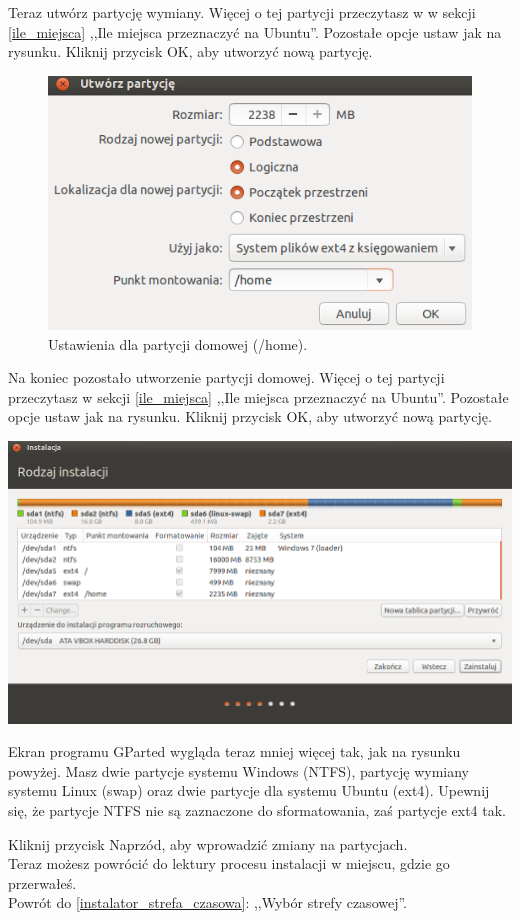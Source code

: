 Teraz utwórz partycję wymiany. Więcej o tej partycji przeczytasz w w sekcji \ref{ile_miejsca} ,,Ile miejsca przeznaczyć na Ubuntu''. Pozostałe opcje ustaw jak na rysunku. Kliknij przycisk \textcolor{ubuntu_orange}{OK}, aby utworzyć nową partycję.

\begin{figure}
	\vspace{-10pt}
	\includegraphics[width=\linewidth]{images/instalator_partycjonowanie_gparted_dodaj_home.png}
	\caption*{Ustawienia dla partycji domowej (/home).}
\end{figure}

Na koniec pozostało utworzenie partycji domowej. Więcej o tej partycji przeczytasz w sekcji \ref{ile_miejsca} ,,Ile miejsca przeznaczyć na Ubuntu''. Pozostałe opcje ustaw jak na rysunku. Kliknij przycisk \textcolor{ubuntu_orange}{OK}, aby utworzyć nową partycję.

\begin{center}
	\includegraphics[width=\linewidth]{images/instalator_partycjonowanie_gparted4.png}
\end{center}

Ekran programu GParted wygląda teraz mniej więcej tak, jak na rysunku powyżej. Masz dwie partycje systemu Windows (NTFS), partycję wymiany systemu Linux (swap) oraz dwie partycje dla systemu Ubuntu (ext4). Upewnij się, że partycje NTFS \textcolor{ubuntu_orange}{nie} są zaznaczone do sformatowania, zaś partycje ext4 tak.

Kliknij przycisk \textcolor{ubuntu_orange}{Naprzód}, aby wprowadzić zmiany na partycjach.\\
Teraz możesz powrócić do lektury procesu instalacji w miejscu, gdzie go przerwałeś.\\
Powrót do \ref{instalator_strefa_czasowa}: ,,Wybór strefy czasowej''.
\clearpage